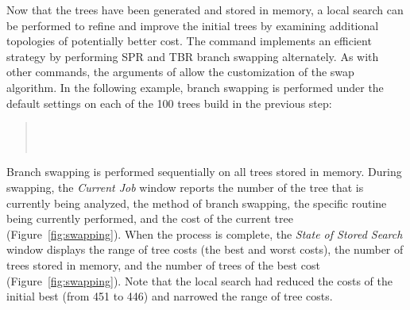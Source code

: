 Now that the trees have been generated and stored in memory, a local search can be performed to refine and improve the initial trees by examining additional topologies of potentially better cost.  The command  implements an efficient strategy by performing SPR and TBR branch swapping alternately. As with other commands, the arguments of  allow the customization of the swap algorithm. In the following example, branch swapping is performed under the default settings on each of the 100 trees build in the previous step:

\begin{quote}
 	\\
 	\\
\end{quote}

Branch swapping is performed sequentially on all trees stored in memory. During swapping, the \emph{Current Job} window reports the number of the tree that is currently being analyzed, the method of branch swapping, the specific routine being currently performed, and the cost of the current tree (Figure~\ref{fig:swapping}). When the process is complete, the \emph{State of Stored Search} window displays the range of tree costs (the best and worst costs), the number of trees stored in memory, and the number of trees of the best cost (Figure~\ref{fig:swapping}). Note that the local search had reduced the costs of the initial best (from 451 to 446) and narrowed the range of tree costs.

